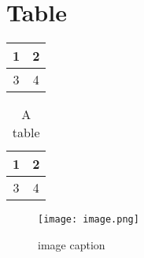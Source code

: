 \documentclass{article}
\begin{document}
    \newpage
    \section{Table}

    \begin{tabular}{|c|c|} %
        \hline 
        1 & 2 \\
        \hline
        3 & 4 \\
        \hline
    \end{tabular}

    \begin{table}
        \caption{A table}
        \begin{center}
            \begin{tabular}{|c|c|} 
                \hline 
                1 & 2 \\
                \hline
                3 & 4 \\
                \hline
            \end{tabular}
        \end{center}
    \end{table}

    \begin{figure}
        \centering
        \texttt{[image: image.png]}
        \caption{image caption}

    \end{figure}
\end{document}
